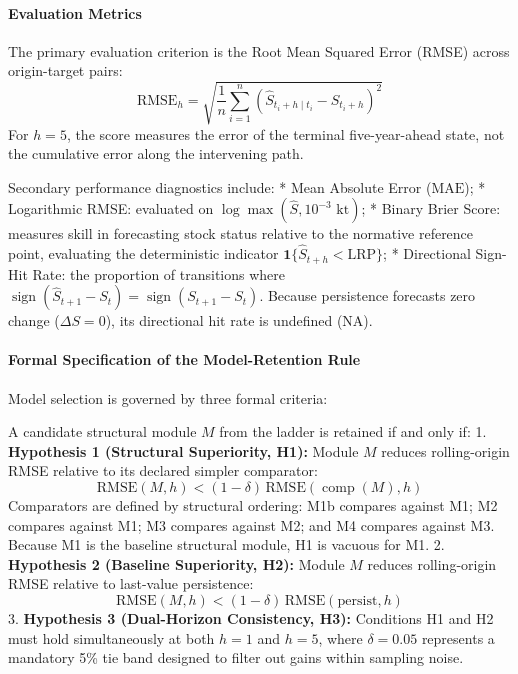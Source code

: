 \documentclass[11pt]{article}
\begin{document}
\paragraph{Evaluation Metrics}\label{evaluation-metrics}

The primary evaluation criterion is the Root Mean Squared Error (RMSE)
across origin-target pairs:
\[\mathrm{RMSE}_h = \sqrt{\frac{1}{n} \sum_{i=1}^n \left(\hat{S}_{t_i+h \mid t_i} - S_{t_i+h}\right)^2}\]
For \(h=5\), the score measures the error of the terminal
five-year-ahead state, not the cumulative error along the intervening
path.

Secondary performance diagnostics include: * Mean Absolute Error
(\(\mathrm{MAE}\)); * Logarithmic RMSE: evaluated on
\(\log\max(\hat{S}, 10^{-3}\text{ kt})\); * Binary Brier Score: measures
skill in forecasting stock status relative to the normative reference
point, evaluating the deterministic indicator
\(\mathbf{1}\{\hat{S}_{t+h} < \mathrm{LRP}\}\); * Directional Sign-Hit
Rate: the proportion of transitions where
\(\operatorname{sign}(\hat{S}_{t+1} - S_t) = \operatorname{sign}(S_{t+1} - S_t)\).
Because persistence forecasts zero change (\(\Delta S = 0\)), its
directional hit rate is undefined (\(\mathrm{NA}\)).

\paragraph{Formal Specification of the Model-Retention
Rule}\label{formal-specification-of-the-model-retention-rule}

Model selection is governed by three formal criteria:

A candidate structural module \(M\) from the ladder is retained if and
only if: 1. \textbf{Hypothesis 1 (Structural Superiority, H1):} Module
\(M\) reduces rolling-origin RMSE relative to its declared simpler
comparator:
\[\mathrm{RMSE}(M, h) < (1 - \delta) \, \mathrm{RMSE}(\operatorname{comp}(M), h)\]
Comparators are defined by structural ordering: M1b compares against M1;
M2 compares against M1; M3 compares against M2; and M4 compares against
M3. Because M1 is the baseline structural module, H1 is vacuous for M1.
2. \textbf{Hypothesis 2 (Baseline Superiority, H2):} Module \(M\)
reduces rolling-origin RMSE relative to last-value persistence:
\[\mathrm{RMSE}(M, h) < (1 - \delta) \, \mathrm{RMSE}(\mathrm{persist}, h)\]
3. \textbf{Hypothesis 3 (Dual-Horizon Consistency, H3):} Conditions H1
and H2 must hold simultaneously at both \(h=1\) and \(h=5\), where
\(\delta = 0.05\) represents a mandatory 5\% tie band designed to filter
out gains within sampling noise.
\end{document}
